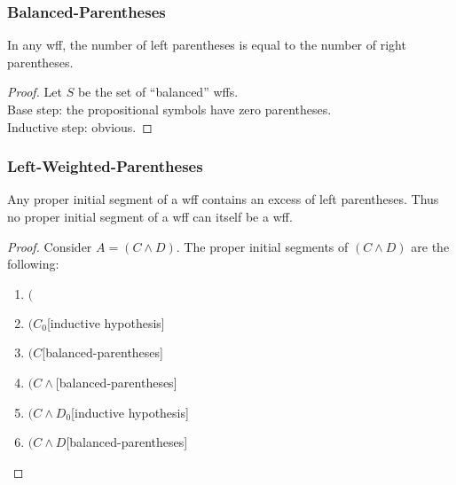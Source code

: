 \documentclass[UTF8,11pt,colorlinks,compress,openany]{beamer}%
\begin{document}
\begin{frame}\frametitle{Balanced-Parentheses}
	\begin{corollary}
		In any wff, the number of left parentheses is equal to the number of right parentheses.
	\end{corollary}
	\begin{proof}
		Let $S$ be the set of ``balanced'' wffs.\\
		Base step: the propositional symbols have zero parentheses.\\
		Inductive step: obvious.
	\end{proof}
\end{frame}

\begin{frame}\frametitle{Left-Weighted-Parentheses}
	\begin{lemma}
		Any proper initial segment of a wff contains an excess of left parentheses. Thus no proper initial segment of a wff can itself be a wff.
	\end{lemma}
\setlength\abovedisplayskip{0pt}
\setlength\belowdisplayskip{0pt}
	\begin{proof}
		Consider $A=(C\wedge D)$. The proper initial segments of $(C\wedge D)$ are the following:
		\begin{enumerate}
			\item $($
			\item $(C_0$\hfill [inductive hypothesis]
			\item $(C$\hfill [balanced-parentheses]
			\item $(C\wedge$\hfill [balanced-parentheses]
			\item $(C\wedge D_0$\hfill [inductive hypothesis]
			\item $(C\wedge D$\hfill [balanced-parentheses]
		\end{enumerate}
	\end{proof}
\end{frame}
\end{document}
